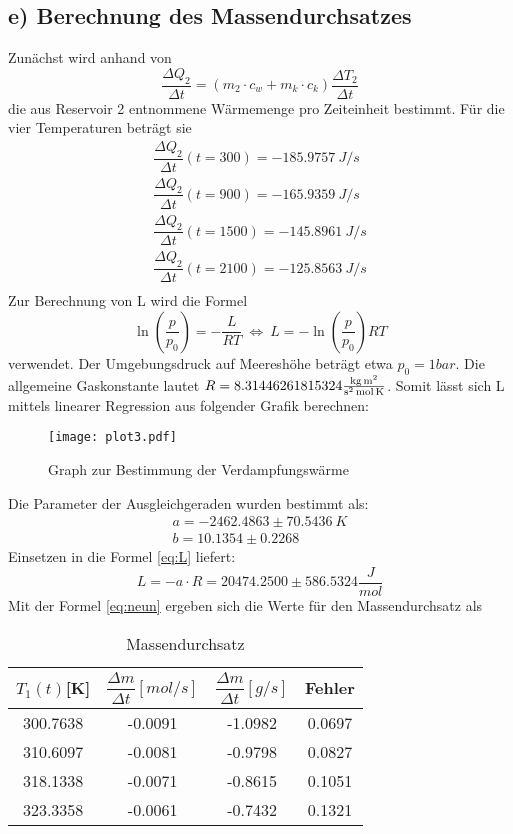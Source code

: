 \subsection{e) Berechnung des Massendurchsatzes}
Zunächst wird anhand von
\begin{equation}
  \label{eq: dadamm}
  \dfrac{\Delta Q_2}{\Delta t}=(m_2\cdot c_w + m_k\cdot c_k)\dfrac{\Delta T_2}{\Delta t}
\end{equation}
die aus Reservoir 2 entnommene Wärmemenge pro Zeiteinheit bestimmt. 
Für die vier Temperaturen beträgt sie 
\begin{align*}
  \dfrac{\Delta Q_2}{\Delta t}(t=300)=-185.9757\ J/s\\
  \dfrac{\Delta Q_2}{\Delta t}(t=900)=-165.9359\ J/s\\
  \dfrac{\Delta Q_2}{\Delta t}(t=1500)=-145.8961\ J/s\\
  \dfrac{\Delta Q_2}{\Delta t}(t=2100)=-125.8563\ J/s\\
\end{align*}
Zur Berechnung von L wird die Formel 
\begin{equation}
  \label{eq:L}
  \ln{(\dfrac{p}{p_0})}=-\dfrac{L}{RT}\ \Leftrightarrow \ L=-\ln{(\dfrac{p}{p_0})}RT
\end{equation} 
verwendet. Der Umgebungsdruck auf Meereshöhe beträgt etwa
$p_0=1 bar$. Die allgemeine Gaskonstante lautet $R=8.31446261815324
{\displaystyle \textstyle {\frac {\mathrm {kg\,m^{2}} }{\mathrm {s^{2}\,mol\,K} }}} $. Somit lässt 
sich L mittels linearer Regression aus folgender Grafik berechnen:
\begin{figure}[H]
  \centering
  \texttt{[image: plot3.pdf]}
  \caption{Graph zur Bestimmung der Verdampfungswärme}
  \label{fig:L}
\end{figure}
Die Parameter der Ausgleichgeraden wurden bestimmt als:
\begin{align*}
  a=-2462.4863 \pm 70.5436\ K\\
  b=10.1354 \pm 0.2268
\end{align*}
Einsetzen in die Formel \eqref{eq:L} liefert:
\begin{equation*}
  L= - a \cdot R = 20474.2500 \pm 586.5324 \dfrac{J}{mol}
\end{equation*}
Mit der Formel \eqref{eq:neun} ergeben sich die Werte für den Massendurchsatz als 
\begin{table}[H] 
  \centering
  \caption{Massendurchsatz}
  \label{tab:data2}
  \begin{tabular}{c c c c}
    \toprule
    $T_1(t)$[K] & $\dfrac{\Delta m}{\Delta t}[mol/s]$ & $\dfrac{\Delta m}{\Delta t}[g/s]$ & Fehler\\
    \midrule
      300.7638 & -0.0091 & -1.0982 & 0.0697\\
      310.6097 & -0.0081 & -0.9798 & 0.0827\\
      318.1338 & -0.0071 & -0.8615 & 0.1051\\
      323.3358 & -0.0061 & -0.7432 & 0.1321\\
    \bottomrule
  \end{tabular}
\end{table}
